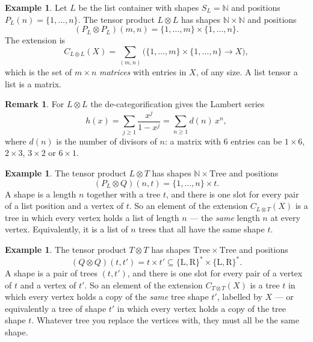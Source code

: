 \documentclass[11pt, a4paper]{article}
\theoremstyle{definition}
\newtheorem{example}[definition]{Example}
\newtheorem{remark}[definition]{Remark}
\theoremstyle{plain}
\begin{document}
\begin{example}\label{ex:tensor-list-list}
Let $L$ be the list container with shapes $S_L = \mathbb{N}$ and positions
$P_L(n) = \{1, \ldots, n\}$.  The tensor product $L \otimes L$ has shapes
$\mathbb{N} \times \mathbb{N}$ and positions
\[
  (P_L \otimes P_L)(m, n) = \{1, \ldots, m\} \times \{1, \ldots, n\}.
\]
The extension is
\[
  C_{L \otimes L}(X) = \sum_{(m, n)}
  \bigl(\{1, \ldots, m\} \times \{1, \ldots, n\} \to X\bigr),
\]
which is the set of $m \times n$ \emph{matrices} with entries in $X$, of
any size.  A list tensor a list is a matrix.
\end{example}

\noindent\colorbox{blue!10}{\parbox{\dimexpr\linewidth-2\fboxsep}{%
\begin{remark}
For $L \otimes L$ the de-categorification gives the Lambert series
\[
  h(x) = \sum_{j \geq 1} \frac{x^j}{1 - x^j} = \sum_{n \geq 1} d(n)\, x^n,
\]
where $d(n)$ is the number of divisors of $n$: a matrix with $6$
entries can be $1 \times 6$, $2 \times 3$, $3 \times 2$ or $6 \times 1$.
\end{remark}%
}}

\begin{example}\label{ex:tensor-list-tree}
The tensor product $L \otimes T$ has shapes $\mathbb{N} \times
\mathrm{Tree}$ and positions
\[
  (P_L \otimes Q)(n, t) = \{1, \ldots, n\} \times t.
\]
A shape is a length $n$ together with a tree $t$, and there is one slot
for every pair of a list position and a vertex of $t$.  So an element of
the extension $C_{L \otimes T}(X)$ is a tree in which every vertex holds
a list of length $n$ --- the \emph{same} length $n$ at every vertex.
Equivalently, it is a list of $n$ trees that all have the same shape $t$.
\end{example}

\begin{example}\label{ex:tensor-tree-tree}
The tensor product $T \otimes T$ has shapes $\mathrm{Tree} \times
\mathrm{Tree}$ and positions
\[
  (Q \otimes Q)(t, t') = t \times t'
  \subseteq \{\mathrm{L},\mathrm{R}\}^* \times \{\mathrm{L},\mathrm{R}\}^*.
\]
A shape is a pair of trees $(t, t')$, and there is one slot for every
pair of a vertex of $t$ and a vertex of $t'$.  So an element of the
extension $C_{T \otimes T}(X)$ is a tree $t$ in which every vertex holds
a copy of the \emph{same} tree shape $t'$, labelled by $X$ --- or
equivalently a tree of shape $t'$ in which every vertex holds a copy of
the tree shape $t$.  Whatever tree you replace the vertices with, they
must all be the same shape.
\end{example}
\end{document}
